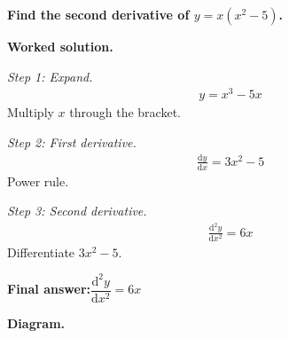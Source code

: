 \documentclass[11pt]{article}
\newcommand{\question}[1]{\par\medskip\noindent\textbf{#1}\par}
\begin{document}
\question{Find the second derivative of \( y = x(x^2 - 5) \).}

\textbf{Worked solution.}

\textit{Step 1: Expand.}
\[\begin{gathered}
y = x^3 - 5x
\end{gathered}\]
Multiply \( x \) through the bracket.

\textit{Step 2: First derivative.}
\[\begin{gathered}
\frac{\mathrm{d}y}{\mathrm{d}x} = 3x^2 - 5
\end{gathered}\]
Power rule.

\textit{Step 3: Second derivative.}
\[\begin{gathered}
\frac{\mathrm{d}^2y}{\mathrm{d}x^2} = 6x
\end{gathered}\]
Differentiate \(3x^2 - 5\).

\begin{answerbox}
\textbf{Final answer:}\quad \(\displaystyle  \dfrac{\mathrm{d}^2y}{\mathrm{d}x^2} = 6x \)
\end{answerbox}
\textbf{Diagram.}
\end{document}
